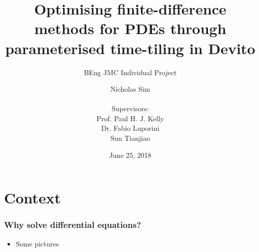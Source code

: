 \documentclass{beamer}
\begin{document}
\title{Optimising finite-difference methods for PDEs through parameterised time-tiling in Devito}
\subtitle{BEng JMC Individual Project}

\author{Nicholas Sim\\
~\\
{\normalsize Supervisors:}\\
Prof. Paul H. J. Kelly\\
Dr. Fabio Luporini\\
Sun Tianjiao}

\date{June 25, 2018}

\frame{\titlepage}



\section{Context}


\begin{frame}
\frametitle{Why solve differential equations?}

\begin{itemize}
	\item Some pictures
\end{itemize}
\end{frame}
\end{document}
